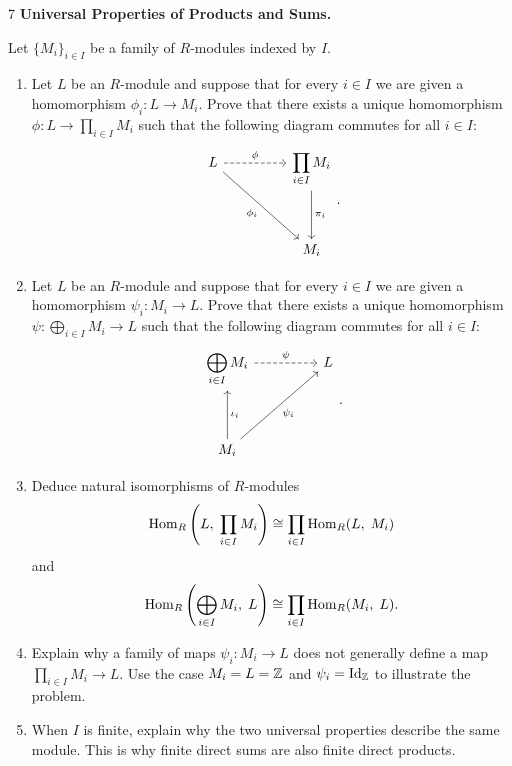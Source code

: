 \documentclass[Notebook.tex]{subfiles}
\begin{document}
    \begin{problem}{7}
        \textbf{Universal Properties of Products and Sums.} 
        
        Let $\{M_{i}\}_{i\in I}$ be a family of $R$-modules indexed by $I$. 
        \begin{enumerate}
        \item Let $L$ be an $R$-module and suppose that for every $i\in I$ we are given a homomorphism $\phi_i:L\to M_i$. Prove that there exists a unique homomorphism $\phi:L\to \prod_{i\in I}M_i$ such that the following diagram commutes for all $i\in I$:
        \[
        \begin{tikzcd}[row sep = 3.5em, column sep = 4.5em]
        L \arrow[r, dashed, "\phi"] \arrow[dr, swap, "\phi_i"] & \displaystyle \prod_{i \in I} M_{i} \arrow[d, "\pi_i"] \\
        & M_{i}
        \end{tikzcd}.
        \]
        \item Let $L$ be an $R$-module and suppose that for every $i\in I$ we are given a homomorphism $\psi_i:M_i\to L$. Prove that there exists a unique homomorphism $\psi:\bigoplus_{i\in I} M_{i} \to L$ such that the following diagram commutes for all $i\in I$:
        \[
        \begin{tikzcd}[row sep = 3.5em, column sep = 4.5em]
        \displaystyle \bigoplus_{i\in I} M_{i} \arrow[r, dashed, "\psi"] & L\\
        M_{i} \arrow[u, swap, "\iota_{i}"] \arrow[ur, swap, "\psi_{i}"]&
        \end{tikzcd}.
        \]
        \item Deduce natural isomorphisms of $R$-modules
        \[
        \operatorname{Hom}_R\left(L, \; \prod_{i\in I}M_i\right)\cong \prod_{i\in I}\operatorname{Hom}_R(L,\; M_i)
        \] and \[
        \operatorname{Hom}_R\left(\bigoplus_{i\in I}M_i,\; L\right)\cong \prod_{i\in I}\operatorname{Hom}_R(M_i,\; L).
        \]
        \item Explain why a family of maps $\psi_i:M_i\to L$ does not generally define a map $\prod_{i \in I} M_i\to L$. Use the case $M_i=L=\mathbb Z$ and $\psi_i=\operatorname{Id}_{\mathbb Z}$ to illustrate the problem.
        \item When $I$ is finite, explain why the two universal properties describe the same module. This is why finite direct sums are also finite direct products.
        \end{enumerate}

    \end{problem}
\end{document}
